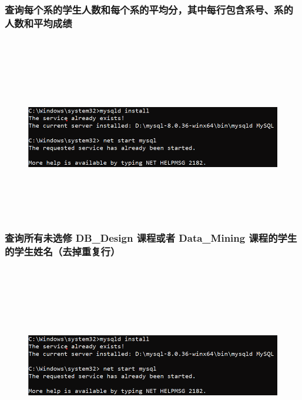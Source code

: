 \documentclass{ctexart}
\begin{document}
\subsubsection{查询每个系的学生人数和每个系的平均分，其中每行包含系号、系的人数和平均成绩}
\begin{lstlisting}[language=sql]
	
\end{lstlisting}
\begin{figure}[H]
	\centering 
	\includegraphics[height=7cm,width=14cm]{1.png}
	\end{figure}
\subsubsection{查询所有未选修 DB\_Design 课程或者 Data\_Mining 课程的学生的学生姓名（去掉重复行）}
\begin{lstlisting}[language=sql]
	
\end{lstlisting}
\begin{figure}[H]
	\centering 
	\includegraphics[height=7cm,width=14cm]{1.png}
	\end{figure}
\end{document}
